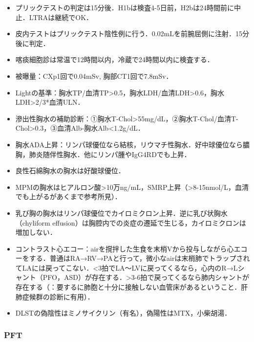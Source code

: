 \begin{itemize}
\item プリックテストの判定は15分後．H1bは検査4-5日前，H2bは24時間前に中止．LTRAは継続でOK．
\item 皮内テストはプリックテスト陰性例に行う．0.02mLを前腕屈側に注射．15分後に判定．
\item 喀痰細胞診は常温で12時間以内，冷蔵で24時間以内に検査する．
\item 被曝量：CXp1回で0.04mSv, 胸部CT1回で7.8mSv．
\item Lightの基準：胸水TP/血清TP>0.5，胸水LDH/血清LDH>0.6，胸水LDH>2/3*血清ULN．
\item 滲出性胸水の補助診断：①胸水T-Chol>55mg/dL，②胸水T-Chol/血清T-Chol>0.3，③血清Alb-胸水Alb<1.2g/dL．
\item 胸水ADA上昇：リンパ球優位なら結核，リウマチ性胸水．好中球優位なら膿胸，肺炎随伴性胸水．他にリンパ腫やIgG4RDでも上昇．
\item 良性石綿胸水の胸水は好酸球優位．
\item MPMの胸水はヒアルロン酸>10万ng/mL，SMRP上昇（>8-15nmol/L，血清でも上がるがあくまで参考所見）．
\item 乳び胸の胸水はリンパ球優位でカイロミクロン上昇．逆に乳び状胸水（chyliform effusion）は胸腔内での炎症の遷延で生じる，カイロミクロンは増加しない．
\item コントラスト心エコー：airを撹拌した生食を末梢Vから投与しながら心エコーをする．普通はRA→RV→PAと行って，微小なairは末梢肺でトラップされてLAには戻ってこない．<3拍でLA〜LVに戻ってくるなら，心内のR→Lシャント（PFO，ASD）が存在する．>3-6拍で戻ってくるなら肺内シャントが存在する（：要するに肺胞と十分に接触しない血管床があるということ．肝肺症候群の診断に有用）．
\item DLSTの偽陰性はミノサイクリン（有名），偽陽性はMTX，小柴胡湯．
\end{itemize}


\subsubsection{PFT}

